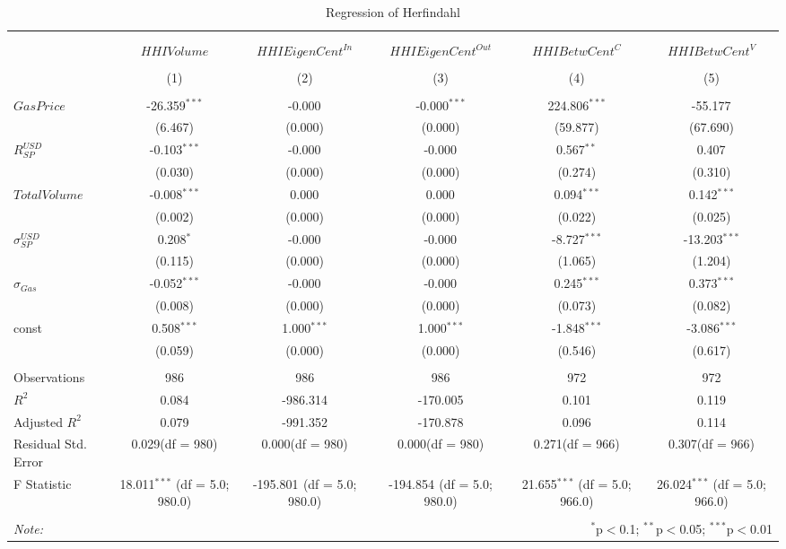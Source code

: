\begin{table}[!htbp] \centering
  \caption{Regression of Herfindahl}
\begin{tabular}{@{\extracolsep{5pt}}lccccc}
\\[-1.8ex]\hline
\hline \\[-1.8ex]
\\[-1.8ex] & \multicolumn{1}{c}{${	 HHIVolume}$} & \multicolumn{1}{c}{${	 HHIEigenCent}^{In}$} & \multicolumn{1}{c}{${	 HHIEigenCent}^{Out}$} & \multicolumn{1}{c}{${	 HHIBetwCent}^C$} & \multicolumn{1}{c}{${	 HHIBetwCent}^V$}  \\
\\[-1.8ex] & (1) & (2) & (3) & (4) & (5) \\
\hline \\[-1.8ex]
 ${	 GasPrice}$ & -26.359$^{***}$ & -0.000$^{}$ & -0.000$^{***}$ & 224.806$^{***}$ & -55.177$^{}$ \\
  & (6.467) & (0.000) & (0.000) & (59.877) & (67.690) \\
 ${	 R}^{USD}_{SP}$ & -0.103$^{***}$ & -0.000$^{}$ & -0.000$^{}$ & 0.567$^{**}$ & 0.407$^{}$ \\
  & (0.030) & (0.000) & (0.000) & (0.274) & (0.310) \\
 ${	 TotalVolume}$ & -0.008$^{***}$ & 0.000$^{}$ & 0.000$^{}$ & 0.094$^{***}$ & 0.142$^{***}$ \\
  & (0.002) & (0.000) & (0.000) & (0.022) & (0.025) \\
 ${	 \sigma}^{USD}_{SP}$ & 0.208$^{*}$ & -0.000$^{}$ & -0.000$^{}$ & -8.727$^{***}$ & -13.203$^{***}$ \\
  & (0.115) & (0.000) & (0.000) & (1.065) & (1.204) \\
 ${	 \sigma}_{Gas}$ & -0.052$^{***}$ & -0.000$^{}$ & -0.000$^{}$ & 0.245$^{***}$ & 0.373$^{***}$ \\
  & (0.008) & (0.000) & (0.000) & (0.073) & (0.082) \\
 const & 0.508$^{***}$ & 1.000$^{***}$ & 1.000$^{***}$ & -1.848$^{***}$ & -3.086$^{***}$ \\
  & (0.059) & (0.000) & (0.000) & (0.546) & (0.617) \\
\hline \\[-1.8ex]
 Observations & 986 & 986 & 986 & 972 & 972 \\
 $R^2$ & 0.084 & -986.314 & -170.005 & 0.101 & 0.119 \\
 Adjusted $R^2$ & 0.079 & -991.352 & -170.878 & 0.096 & 0.114 \\
 Residual Std. Error & 0.029(df = 980) & 0.000(df = 980) & 0.000(df = 980) & 0.271(df = 966) & 0.307(df = 966)  \\
 F Statistic & 18.011$^{***}$ (df = 5.0; 980.0) & -195.801$^{}$ (df = 5.0; 980.0) & -194.854$^{}$ (df = 5.0; 980.0) & 21.655$^{***}$ (df = 5.0; 966.0) & 26.024$^{***}$ (df = 5.0; 966.0) \\
\hline
\hline \\[-1.8ex]
\textit{Note:} & \multicolumn{5}{r}{$^{*}$p$<$0.1; $^{**}$p$<$0.05; $^{***}$p$<$0.01} \\
\end{tabular}
\end{table}